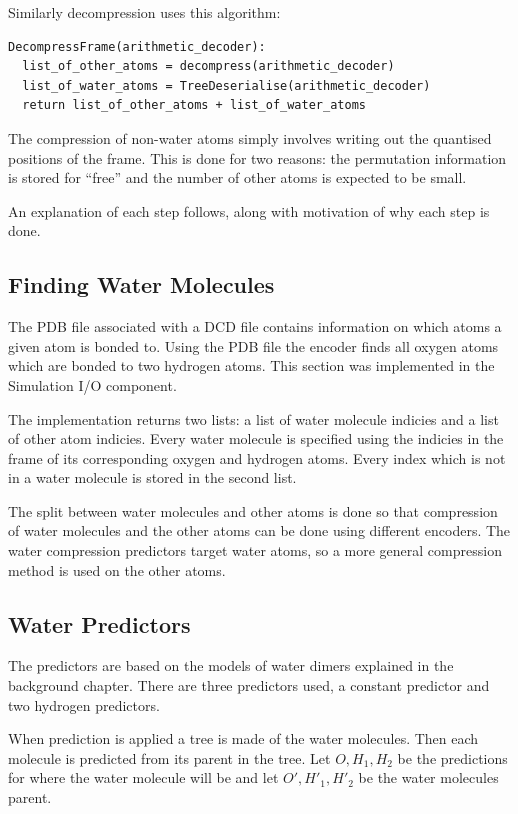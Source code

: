 \documentclass[a4paper]{report}
\begin{document}
\noindent Similarly decompression uses this algorithm:

\begin{verbatim}
DecompressFrame(arithmetic_decoder):
  list_of_other_atoms = decompress(arithmetic_decoder)
  list_of_water_atoms = TreeDeserialise(arithmetic_decoder)
  return list_of_other_atoms + list_of_water_atoms
\end{verbatim}

The compression of non-water atoms simply involves writing out the quantised
positions of the frame. This is done for two reasons: the permutation
information is stored for ``free'' and the number of other atoms is expected
to be small.

An explanation of each step follows, along with motivation of why each step is
done.


\subsection{Finding Water Molecules}

The PDB file associated with a DCD file contains information on which atoms a
given atom is bonded to. Using the PDB file the encoder finds all oxygen atoms
which are bonded to two hydrogen atoms. This section was implemented in the
Simulation I/O component.

The implementation returns two lists: a list of water molecule indicies and a
list of other atom indicies. Every water molecule is specified using the
indicies in the frame of its corresponding oxygen and hydrogen atoms. Every
index which is not in a water molecule is stored in the second list.

The split between water molecules and other atoms is done so that compression
of water molecules and the other atoms can be done using different
encoders. The water compression predictors target water atoms, so a more
general compression method is used on the other atoms.


\subsection{Water Predictors}
\label{sec:water-predictors}

The predictors are based on the models of water dimers explained in the
background chapter. There are three predictors used, a constant predictor and
two hydrogen predictors.

When prediction is applied a tree is made of the water molecules. Then each
molecule is predicted from its parent in the tree. Let $O, H_1, H_2$ be the
predictions for where the water molecule will be and let $O', H'_1, H'_2$ be
the water molecules parent.
\end{document}
